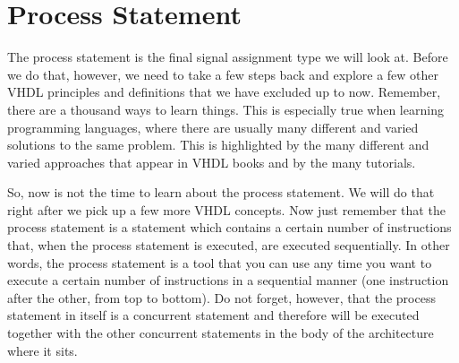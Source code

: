 \section{Process Statement}
The process statement is the final signal assignment type we will look at. Before we do that, however, we need to take a few steps back and explore a few other VHDL principles and definitions that we have excluded up to now. Remember, there are a thousand ways to learn things. This is especially true when learning programming languages, where there are usually many different and varied solutions to the same problem. This is highlighted by the many different and varied approaches that appear in VHDL books and by the many tutorials. 

So, now is not the time to learn about the process statement. We will do that right after we pick up a few more VHDL concepts. Now just remember that the process statement is a statement which contains a certain number of instructions that, when the process statement is executed, are executed sequentially. In other words, the process statement is a tool that you can use any time you want to execute a certain number of instructions in a sequential manner (one instruction after the other, from top to bottom). Do not forget, however, that the process statement in itself is a concurrent statement and therefore will be executed together with the other concurrent statements in the body of the architecture where it sits.

